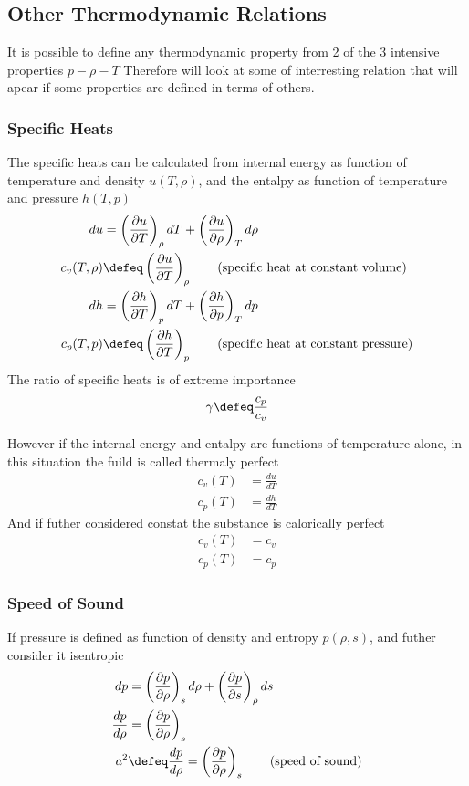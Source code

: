 \subsection{Other Thermodynamic Relations}
It is possible to define any thermodynamic property from 2 of the 3 intensive properties $p-\rho-T$
Therefore will look at some of interresting relation that will apear if some properties are defined in terms of others.

\subsubsection{Specific Heats}
The specific heats can be calculated from internal energy as function of temperature and density $u(T,\rho)$, and the entalpy as function of temperature and pressure $h(T,p)$     
\begin{align}
   du &=  \left( \frac{\partial u }{\partial T} \right)_{\rho} dT + \left( \frac{\partial u }{\partial \rho} \right)_{T} d\rho\\
   c_v(T,\rho) & \defeq  \left( \frac{\partial u }{\partial T} \right)_{\rho} \qquad \text{(specific heat at constant volume)} \\
   dh &=  \left( \frac{\partial h}{\partial T} \right)_{p} dT + \left( \frac{\partial h}{\partial p} \right)_{T} dp\\
   c_p(T,p) & \defeq  \left( \frac{\partial h}{\partial T} \right)_{p}  \qquad \text{(specific heat at constant pressure)} 
\end{align}
The ratio of specific heats is of extreme importance
\begin{align}
\gamma \defeq \frac{c_p}{c_v}
\end{align}


However if the internal energy and entalpy are functions of temperature alone, in this situation the fuild is called thermaly perfect   
\begin{align}
   c_v(T) & = \frac{d u }{d T} \\ 
   c_p(T) & = \frac{d h }{d T} 
\end{align}
And if futher considered constat the substance is calorically perfect
\begin{align}
   c_v(T) & = c_v\\ 
   c_p(T) & = c_p
\end{align}


\subsubsection{Speed of Sound}
If pressure is defined as function of density and entropy $p(\rho,s)$, and futher consider it isentropic 
\begin{align}
   dp & =  \left( \frac{\partial p }{\partial \rho} \right)_s d\rho  + \left( \frac{\partial p }{\partial s} \right)_{\rho} ds\\
   \frac{dp}{d\rho} & =  \left( \frac{\partial p }{\partial \rho} \right)_s \\
   a^2 & \defeq  \frac{dp}{d\rho} = \left( \frac{\partial p }{\partial \rho} \right)_s \qquad \text{(speed of sound)} \\
\end{align}



